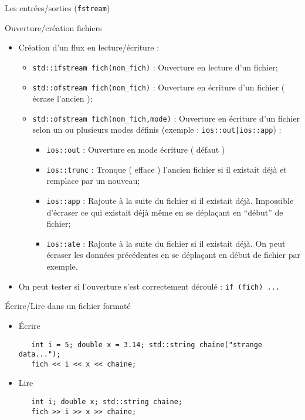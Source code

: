 \documentclass[handout,10pt]{beamer}
\begin{document}
\begin{frame}[fragile]{Les entrées/sorties (\texttt{fstream})}
 \tiny
 \begin{block}{Ouverture/création fichiers}
  \begin{itemize}
   \item Création d'un flux en lecture/écriture :
   \begin{itemize}
   \item \lstinline$std::ifstream fich(nom_fich)$ : Ouverture en lecture d'un fichier;
   \item \lstinline$std::ofstream fich(nom_fich)$ : Ouverture en écriture d'un fichier ( écrase l'ancien );
   \item \lstinline$std::ofstream fich(nom_fich,mode)$ : Ouverture en écriture d'un fichier selon un ou plusieurs modes définis (exemple : \lstinline$ios::out|ios::app$) :
   \begin{itemize}
   \item \lstinline$ios::out$ : Ouverture en mode écriture ( défaut )
   \item \lstinline$ios::trunc$ : Tronque ( efface ) l'ancien fichier si il existait déjà et remplace par un nouveau;
   \item \lstinline$ios::app$   : Rajoute à la suite du fichier si il existait déjà. Impossible d'écraser ce qui existait déjà même en se déplaçant en ``début'' de fichier;
   \item \lstinline$ios::ate$   : Rajoute à la suite du fichier si il existait déjà. On peut écraser les données précédentes en se déplaçant en début de fichier par exemple.
   \end{itemize}
   \end{itemize}
   \item On peut tester si l'ouverture s'est correctement déroulé : \lstinline$if (fich) ...$
  \end{itemize}
 \end{block}

 \begin{block}{\'Ecrire/Lire dans un fichier formaté}
  \begin{itemize}
  \item \'Ecrire
\begin{lstlisting}
   int i = 5; double x = 3.14; std::string chaine("strange data...");
   fich << i << x << chaine;
\end{lstlisting}
   \item Lire
\begin{lstlisting}
   int i; double x; std::string chaine;
   fich >> i >> x >> chaine;
\end{lstlisting}
  \end{itemize}
 \end{block}
 
\end{frame}
\end{document}
